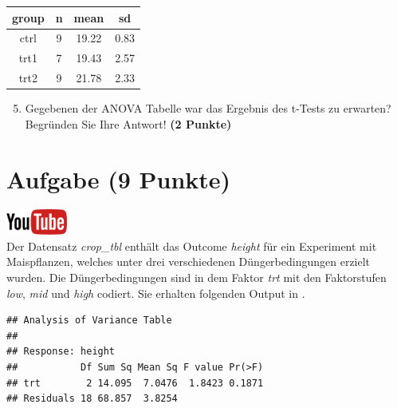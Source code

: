 \documentclass[a4paper, 9pt]{scrartcl}\usepackage[]{graphicx}\usepackage[]{xcolor}
\makeatletter
\newenvironment{kframe}{%
 \def\at@end@of@kframe{}%
 \ifinner\ifhmode%
  \def\at@end@of@kframe{\end{minipage}}%
  \begin{minipage}{\columnwidth}%
 \fi\fi%
 \def\FrameCommand##1{\hskip\@totalleftmargin \hskip-\fboxsep
 \colorbox{shadecolor}{##1}\hskip-\fboxsep
     \hskip-\linewidth \hskip-\@totalleftmargin \hskip\columnwidth}%
 \MakeFramed {\advance\hsize-\width
   \@totalleftmargin\z@ \linewidth\hsize
   \@setminipage}}%
 {\par\unskip\endMakeFramed%
 \at@end@of@kframe}
\newenvironment{knitrout}{}{} %
\makeatother
\begin{document}
\begin{knitrout}
\color{fgcolor}\begin{table}[!h]
\centering
\begin{tabular}{cccc}
\toprule
group & n & mean & sd\\
\midrule
ctrl & 9 & 19.22 & 0.83\\
trt1 & 7 & 19.43 & 2.57\\
trt2 & 9 & 21.78 & 2.33\\
\bottomrule
\end{tabular}
\end{table}

\end{knitrout}

\begin{enumerate}
  \setcounter{enumi}{4}
\item Gegebenen der ANOVA Tabelle war das Ergebnis des t-Tests zu erwarten?
  Begr{\"u}nden Sie Ihre Antwort! \textbf{(2 Punkte)}
\end{enumerate}

 
\clearpage

\section{Aufgabe \hfill (9 Punkte)}

\hfill\href{https://youtu.be/d4CFR2MKX7I}{\includegraphics[width =
  2cm]{img/youtube}}\\[1Ex]



Der Datensatz \textit{crop\_tbl} enth{\"a}lt das Outcome \textit{height} f{\"u}r ein Experiment mit 
Maispflanzen, welches unter drei 
verschiedenen D{\"u}ngerbedingungen erzielt wurden. Die D{\"u}ngerbedingungen sind in dem Faktor
\textit{trt} mit den Faktorstufen \textit{low},  \textit{mid} und
 \textit{high} codiert. Sie erhalten folgenden Output in \Rlogo.

\begin{knitrout}
\color{fgcolor}\begin{kframe}
\begin{verbatim}
## Analysis of Variance Table
## 
## Response: height
##           Df Sum Sq Mean Sq F value Pr(>F)
## trt        2 14.095  7.0476  1.8423 0.1871
## Residuals 18 68.857  3.8254
\end{verbatim}
\end{kframe}
\end{knitrout}
\end{document}
